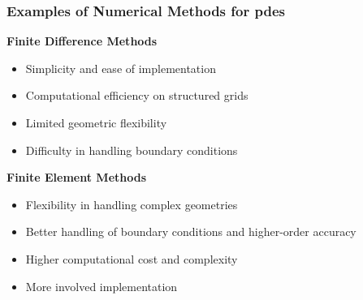 \begin{frame}
    \frametitle{Examples of Numerical Methods for \acrshort{pdes}}

    \vspace*{\fill}
    \begin{multicols}{2}

        \begin{center}
            {\color{\accentcolor} \Large \textbf{Finite Difference Methods}}
            \vspace*{0.5cm}

            \begin{minipage}{0.4\textwidth}
                \begin{itemize}
                    \color{\procolor}
                    \item Simplicity and ease of implementation
                    \item Computational efficiency on structured grids
                \end{itemize}
    
                \begin{itemize}
                    \color{\concolor}
                    \item Limited geometric flexibility
                    \item Difficulty in handling boundary conditions
                \end{itemize}
            \end{minipage}
        \end{center}

        \vfill\null
        \columnbreak

        \begin{center}
            {\color{\accentcolor} \Large \textbf{Finite Element Methods}}
            \vspace*{0.5cm}

            \begin{minipage}{0.4\textwidth}
                \begin{itemize}
                    \color{\procolor}
                    \item Flexibility in handling complex geometries
                    \item Better handling of boundary conditions and higher-order accuracy
                \end{itemize}

                \begin{itemize}
                    \color{\concolor}
                    \item Higher computational cost and complexity
                    \item More involved implementation
                \end{itemize}
            \end{minipage}
        \end{center}
    \end{multicols}
    \vspace*{\fill}
    
\end{frame}


    
